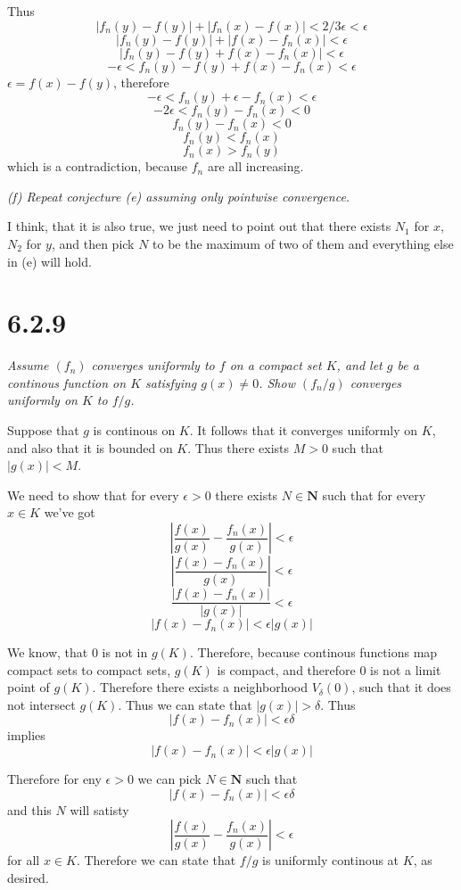 \documentclass[11pt,oneside,titlepage]{book}
\begin{document}
Thus
$$|f_n(y) - f(y)| + |f_n(x) - f(x)| < 2/3\epsilon < \epsilon$$
$$|f_n(y) - f(y)| + |f(x) - f_n(x)| < \epsilon$$
$$|f_n(y) - f(y) + f(x) - f_n(x)| < \epsilon$$
$$-\epsilon < f_n(y) - f(y) + f(x) - f_n(x) < \epsilon$$
$\epsilon = f(x) - f(y)$, therefore
$$-\epsilon < f_n(y) + \epsilon - f_n(x) < \epsilon$$
$$-2\epsilon < f_n(y)- f_n(x) < 0$$
$$ f_n(y)- f_n(x) < 0$$
$$ f_n(y) < f_n(x)$$
$$ f_n(x) > f_n(y)$$
which is a contradiction, because $f_n$ are all increasing.

\textit{(f) Repeat conjecture (e) assuming only pointwise convergence.}

I think, that it is also true, we just need to point out that there
exists $N_1$ for $x$, $N_2$ for $y$, and then pick $N$ to be the maximum of
two of them and everything else in (e) will hold.

\section*{6.2.9}
\textit{Assume $(f_n)$ converges uniformly to $f$ on a compact set $K$, and
  let $g$ be a continous function on $K$ satisfying $g(x) \neq 0$. Show
  $(f_n/g)$ converges uniformly on $K$ to $f/g$. }

Suppose that $g$ is continous on $K$. It follows that it converges uniformly
on $K$, and also that it is bounded on $K$. Thus there exists $M > 0$
such that $|g(x)| < M$.

We need to show that for every $\epsilon > 0$ there exists $N \in \textbf{N}$
such that for every $x \in K$ we've got
$$\left|\frac{f(x)}{g(x)} - \frac{f_n(x)}{g(x)}\right|  < \epsilon$$
$$\left|\frac{f(x) - f_n(x)}{g(x)}\right|  < \epsilon$$
$$\frac{|f(x) - f_n(x)|}{|g(x)|}  < \epsilon$$
$$|f(x) - f_n(x)|  < \epsilon |g(x)|$$

We know, that $0$ is not in $g(K)$. Therefore, because
continous functions map compact sets to compact sets, $g(K)$ is compact,
and therefore $0$ is not a limit point of $g(K)$. Therefore there exists
a neighborhood $V_\delta(0)$, such that it does not intersect $g(K)$.
Thus we can state that $|g(x)| > \delta$. Thus
$$|f(x) - f_n(x)|  < \epsilon \delta$$
implies
$$|f(x) - f_n(x)|  < \epsilon |g(x)|$$

Therefore for eny $\epsilon > 0$ we can pick $N \in \textbf{N}$ such that
$$|f(x) - f_n(x)|  < \epsilon \delta$$
and this $N$ will satisty
$$\left|\frac{f(x)}{g(x)} - \frac{f_n(x)}{g(x)}\right|  < \epsilon$$
for all $x \in K$. 
Therefore we can state that $f/g$ is uniformly continous at $K$, as desired.
\end{document}
